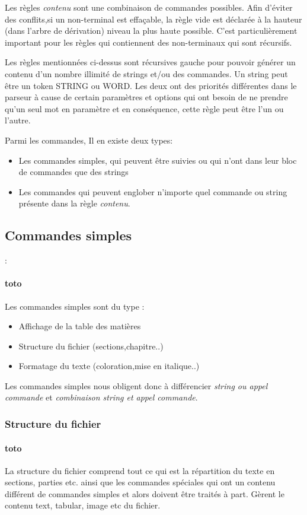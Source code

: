 \documentclass{report}
\begin{document}
{{{Les règles \textit{contenu} sont une combinaison de commandes possibles. Afin d'éviter des conflits,si un non-terminal est effaçable, la règle vide est déclarée à la hauteur (dans l'arbre de dérivation) niveau la plus haute possible. C'est particulièrement important pour les règles qui contiennent des non-terminaux qui sont récursifs.

 Les règles mentionnées ci-dessus sont récursives gauche pour pouvoir générer un contenu d'un nombre illimité de strings et/ou des commandes. Un string peut être un token STRING ou WORD. Les deux ont des priorités différentes dans le parseur à cause de certain paramètres et options qui ont besoin de ne prendre qu'un seul mot en paramètre et en conséquence, cette règle peut être l'un ou l'autre.

Parmi les commandes, Il en existe deux types: 
\begin{itemize}
\item Les commandes simples, qui peuvent être suivies ou qui n'ont dans leur bloc de commandes que des strings 
\item Les commandes qui peuvent englober n'importe quel commande ou string présente dans la règle \textit{contenu}.
\end{itemize}
}
\subsection{Commandes simples}:{
\paragraph{toto}{
Les commandes simples sont du type :
 \begin{itemize}
 \item Affichage de la table des matières
 \item Structure du fichier (sections,chapitre..)
 \item Formatage du texte (coloration,mise en italique..)
\end{itemize} 
Les commandes simples nous obligent donc à différencier
 \textit{string ou appel commande} et 
 \textit{combinaison string et appel commande}.
}
\subsubsection{Structure du fichier}{
\paragraph{toto}{
La structure du fichier comprend tout ce qui est la répartition du texte en sections, parties etc. ainsi que les commandes spéciales qui ont un contenu différent de commandes simples et alors doivent être traités à part.
Gèrent le contenu text, tabular, image etc du fichier.
}
}
}
}}
\end{document}
